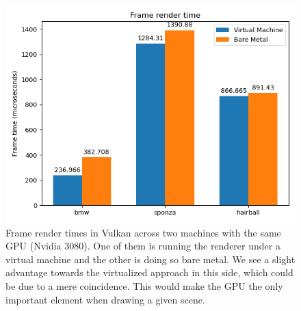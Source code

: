 \begin{figure}[hbt!]
    \centering
    \includegraphics[width=1.0\textwidth]{figuras/vulkan-frametimes-baremetal-virtualized-comparison.png}
    \caption{Frame render times in Vulkan across two machines with the same GPU (Nvidia 3080). One of them is running the renderer under a virtual machine and the other is doing so bare metal. We see a slight advantage towards the virtualized approach in this side, which could be due to a mere coincidence. This would make the GPU the only important element when drawing a given scene.}
    \label{vulkan-frame-times-bm-vm-comparison}
\end{figure}
